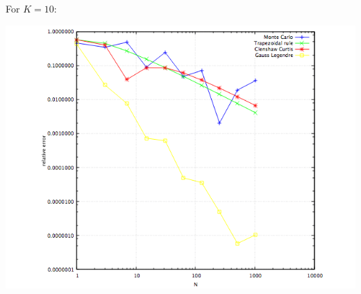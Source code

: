 \documentclass[10pt,a4paper]{article}
\begin{document}
\newpage

For $K=10$:
\begin{center}
\includegraphics[scale=0.5]{relative_errors_K10.png}		
\end{center}	
\end{document}
